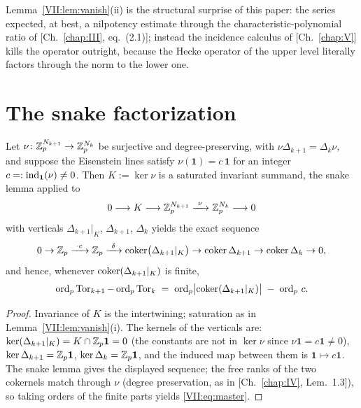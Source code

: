 Lemma~\ref{VII:lem:vanish}(ii) is the structural surprise of this paper: the series
expected, at best, a nilpotency estimate through the characteristic-polynomial ratio
of [Ch.~\ref{chap:III}, eq.~(2.1)]; instead the incidence calculus of [Ch.~\ref{chap:V}] kills the operator
outright, because the Hecke operator of the upper level literally factors through
the norm to the lower one.

\section{The snake factorization}\label{VII:sec:snake}

\begin{theorem}\label{VII:thm:snake}
Let $\nu\colon\mathbb{Z}_p^{N_{k+1}}\to\mathbb{Z}_p^{N_k}$ be surjective and degree-preserving, with
$\nu\Delta_{k+1}=\Delta_k\nu$, and suppose the Eisenstein lines satisfy
$\nu(\mathbf1)=c\,\mathbf1$ for an integer $c=:\operatorname{ind}_{\mathbf1}(\nu)\neq0$. Then $K:=\ker\nu$ is
a saturated invariant summand, the snake lemma applied to
\[
0\longrightarrow K\longrightarrow \mathbb{Z}_p^{N_{k+1}}
\xrightarrow{\ \nu\ }\mathbb{Z}_p^{N_k}\longrightarrow0
\]
with verticals $\Delta_{k+1}|_K$, $\Delta_{k+1}$, $\Delta_k$ yields the exact
sequence
\[
0\to\Zp\xrightarrow{\ \cdot c\ }\Zp\xrightarrow{\ \delta\ }
\coker\bigl(\Delta_{k+1}|_K\bigr)\to\coker\Delta_{k+1}\to\coker\Delta_k\to0 ,
\]
and hence, whenever $\operatorname{coker}(\Delta_{k+1}|_K)$ is finite,
\begin{equation}\label{VII:eq:master}
\operatorname{ord}_p\operatorname{Tor}_{k+1}-\operatorname{ord}_p\operatorname{Tor}_k
\;=\;\operatorname{ord}_p\bigl|\operatorname{coker}(\Delta_{k+1}|_{K})\bigr|\;-\;\operatorname{ord}_p\,c .
\end{equation}
\end{theorem}

\begin{proof}
Invariance of $K$ is the intertwining; saturation as in
Lemma~\ref{VII:lem:vanish}(i). The kernels of the verticals are:
$\ker(\Delta_{k+1}|_K)=K\cap\mathbb{Z}_p\mathbf1=0$ (the constants are not in $\ker\nu$
since $\nu\mathbf1=c\mathbf1\neq0$), $\ker\Delta_{k+1}=\mathbb{Z}_p\mathbf1$,
$\ker\Delta_k=\mathbb{Z}_p\mathbf1$, and the induced map between them is
$\mathbf1\mapsto c\mathbf1$. The snake lemma gives the displayed sequence; the free
ranks of the two cokernels match through $\nu$ (degree preservation, as in
[Ch.~\ref{chap:IV}, Lem.~1.3]), so taking orders of the finite parts yields \eqref{VII:eq:master}.
\end{proof}

